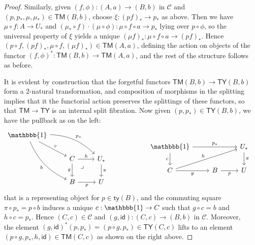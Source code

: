 \documentclass[10pt]{article}
\theoremstyle{definition}
\newcommand{\id}{\mathsf{id}}
\newcommand\Mty{\mathsf{ty}}
\newcommand\C{\mathcal{C}}
\newcommand\Cty{\mathsf{TY}}
\newcommand\Ctm{\mathsf{TM}}
\newcommand\one{\mathbbb{1}}
\newcommand\Un{U}
\newcommand\Ub{U_*}
\newcommand\pb{p_*}
\newcommand\mub{\mu_*}
\newcommand\bb[1]{{(#1)}_*}
\begin{document}
\begin{proof}
  Similarly, given $(f,\phi) : (A,a) \to (B,b)$ in $\C$ and $(p,\pb,\mu,\mub)\in \Ctm(B,b)$, choose $\xi : \bb{pf} \to \pb$ as above.
  Then we have $\mu\circ f : A\to \Ub$ and $(\mub\circ f)\cdot (\mu\circ \phi): \mu\circ f\circ a \to \pb$ lying over $p\circ \phi$, so the universal property of $\xi$ yields a unique $\bb{\mu f} : \mu\circ f\circ a \to \bb{pf}$.
  Hence $(p\circ f, \bb{pf}, \mu\circ f, \bb{\mu f}) \in \Ctm(A,a)$, defining the action on objects of the functor $(f,\phi)^*: \Ctm(B,b) \to \Ctm(A,a)$, and the rest of the structure follows as before.

  It is evident by construction that the forgetful functors $\Ctm(B,b) \to \Cty(B,b)$ form a 2-natural transformation, and composition of morphisms in the splitting implies that it the functorial action preserves the splittings of these functors, so that $\Ctm\to \Cty$ is an internal split fibration.
  Now given $(p,\pb) \in \Cty(B,b)$, we have the pullback as on the left:
  \[
    \begin{tikzcd}
      \one \ar[dr,"c"] \ar[ddr,bend right=20,"b"'] \ar[drr,bend left=20,"\pb"] \\
      &C \ar[r,"h"] \ar[d,"g"'] \ar[dr,near start,phantom,"\lrcorner"] & \Ub \ar[d,"\pi"] \\
      &B \ar[r,"p"'] & \Un
    \end{tikzcd}
    \hspace{2cm}
    \begin{tikzcd}
      \one \ar[d,"c"'] \ar[rr,"\pb"] && \Ub \ar[d,"\pi"] \\
      C \ar[r,"g"'] \ar[urr,"h"] & B \ar[r,"p"'] & \Un
    \end{tikzcd}
  \]
  that is a representing object for $p\in \Mty(B)$, and the commuting square $\pi \circ \pb = p \circ b$ induces a unique $c:\one\to C$ such that $g\circ c = b$ and $h\circ c = \pb$.
  Hence $(C,c) \in \C$ and $(g,\id) : (C,c) \to (B,b)$ in $\C$.
  Moreover, the element $(g,\id)^*(p,\pb) = (p\circ g, \pb) \in \Cty(C,c)$ lifts to an element $(p\circ g, \pb, h, \id) \in \Ctm(C,c)$ as shown on the right above.


\end{proof}
\end{document}
